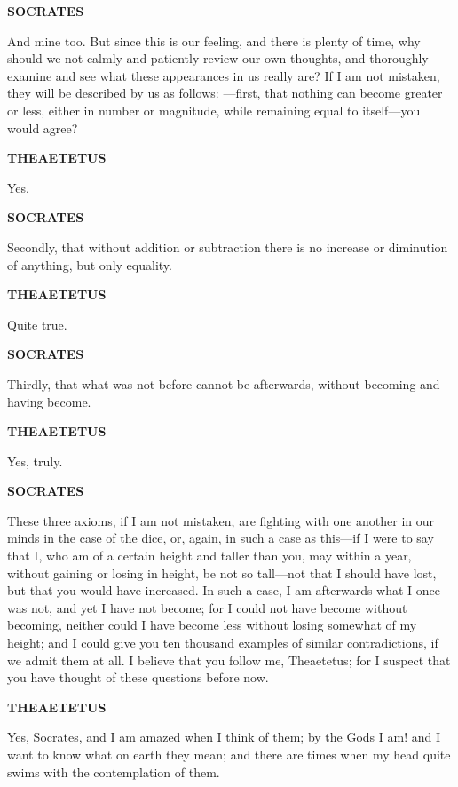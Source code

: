 \documentclass[11pt,letter]{article}
\begin{document}
\par \textbf{SOCRATES}
\par   And mine too. But since this is our feeling, and there is plenty of time, why should we not calmly and patiently review our own thoughts, and thoroughly examine and see what these appearances in us really are? If I am not mistaken, they will be described by us as follows: —first, that nothing can become greater or less, either in number or magnitude, while remaining equal to itself—you would agree?

\par \textbf{THEAETETUS}
\par   Yes.

\par \textbf{SOCRATES}
\par   Secondly, that without addition or subtraction there is no increase or diminution of anything, but only equality.

\par \textbf{THEAETETUS}
\par   Quite true.

\par \textbf{SOCRATES}
\par   Thirdly, that what was not before cannot be afterwards, without becoming and having become.

\par \textbf{THEAETETUS}
\par   Yes, truly.

\par \textbf{SOCRATES}
\par   These three axioms, if I am not mistaken, are fighting with one another in our minds in the case of the dice, or, again, in such a case as this—if I were to say that I, who am of a certain height and taller than you, may within a year, without gaining or losing in height, be not so tall—not that I should have lost, but that you would have increased. In such a case, I am afterwards what I once was not, and yet I have not become; for I could not have become without becoming, neither could I have become less without losing somewhat of my height; and I could give you ten thousand examples of similar contradictions, if we admit them at all. I believe that you follow me, Theaetetus; for I suspect that you have thought of these questions before now.

\par \textbf{THEAETETUS}
\par   Yes, Socrates, and I am amazed when I think of them; by the Gods I am! and I want to know what on earth they mean; and there are times when my head quite swims with the contemplation of them.
\end{document}
